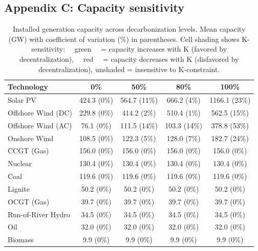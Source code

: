 \documentclass[preprint,12pt,nopreprintline]{elsarticle}
\begin{document}
\newpage

\subsection{Appendix C: Capacity sensitivity} \label{Appendix_C}
\medskip
\begin{table}[H]
\centering
\caption{Installed generation capacity across decarbonization levels. Mean capacity (GW) with coefficient of variation (\%) in parentheses. Cell shading shows K-sensitivity: \colorbox{green!50}{~~green~~} = capacity increases with K (favored by decentralization), \colorbox{red!50}{~~red~~} = capacity decreases with K (disfavored by decentralization), unshaded = insensitive to K-constraint.}
\label{tab:generation_capacity_summary}
\begin{tabular}{l|cccc}
\toprule
Technology & 0\% & 50\% & 80\% & 100\% \\
\midrule
Solar PV & 424.3 (0\%) & \cellcolor{green!15} 564.7 (11\%) & 666.2 (4\%) & \cellcolor{red!50} 1166.1 (23\%) \\
Offshore Wind (DC) & 229.8 (0\%) & 414.2 (2\%) & 510.4 (1\%) & \cellcolor{green!50} 562.5 (15\%) \\
Offshore Wind (AC) & 76.1 (0\%) & \cellcolor{red!30} 111.5 (14\%) & \cellcolor{red!30} 103.3 (14\%) & \cellcolor{red!50} 378.8 (53\%) \\
Onshore Wind & 108.5 (0\%) & 122.3 (5\%) & 128.0 (7\%) & \cellcolor{green!50} 182.7 (24\%) \\
CCGT (Gas) & 156.0 (0\%) & 156.0 (0\%) & 156.0 (0\%) & 156.0 (0\%) \\
Nuclear & 130.4 (0\%) & 130.4 (0\%) & 130.4 (0\%) & 130.4 (0\%) \\
Coal & 119.6 (0\%) & 119.6 (0\%) & 119.6 (0\%) & 119.6 (0\%) \\
Lignite & 50.2 (0\%) & 50.2 (0\%) & 50.2 (0\%) & 50.2 (0\%) \\
OCGT (Gas) & 39.7 (0\%) & 39.7 (0\%) & 39.7 (0\%) & 39.7 (0\%) \\
Run-of-River Hydro & 34.5 (0\%) & 34.5 (0\%) & 34.5 (0\%) & 34.5 (0\%) \\
Oil & 32.0 (0\%) & 32.0 (0\%) & 32.0 (0\%) & 32.0 (0\%) \\
Biomass & 9.9 (0\%) & 9.9 (0\%) & 9.9 (0\%) & 9.9 (0\%) \\
\bottomrule
\end{tabular}
\end{table}

\newpage
\end{document}
